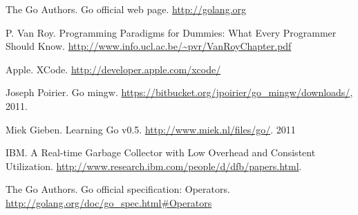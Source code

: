 \begin{thebibliography}{99}

 The Go Authors. Go official web page. \url{http://golang.org}

 P. Van Roy. Programming Paradigms for Dummies: What Every
Programmer Should Know. \url{http://www.info.ucl.ac.be/~pvr/VanRoyChapter.pdf}

 Apple. XCode. \url{http://developer.apple.com/xcode/}

 Joseph Poirier. Go mingw.
\url{https://bitbucket.org/jpoirier/go\_mingw/downloads/}, 2011.

 Miek Gieben. Learning Go v0.5.
\url{http://www.miek.nl/files/go/}. 2011

 IBM. A Real-time Garbage Collector with Low Overhead and
Consistent Utilization. \url{http://www.research.ibm.com/people/d/dfb/papers.html}.

 The Go Authors. Go official specification: Operators.
\url{http://golang.org/doc/go\_spec.html#Operators}

\end{thebibliography}
